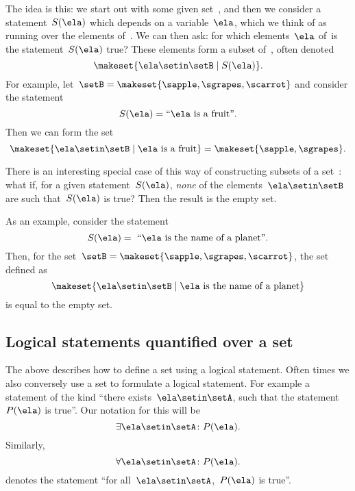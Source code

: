 The idea is this: we start out with some given set~\setB, and then we consider a statement~$S(\ela)$ which depends on a variable~$\ela$, which we think of as running over the elements of~\setB.
We can then ask: for which elements~$\ela$ of~\setB is the statement~$S(\ela)$ true?
These elements form a subset of~\setB, often denoted
%
\begin{equation}
    \label{eq:axiom-specialization}
    \makeset{ \ela \setin\setB \mid S(\ela) }.
\end{equation}
%
For example, let~$\setB = \makeset{ \sapple, \sgrapes, \scarrot}$ and consider the statement
%
\begin{equation}
    S(\ela) = \text{``$\ela$ is a fruit''}.
\end{equation}
%
Then we can form the set
%
\begin{equation}
    \makeset{ \ela \setin\setB \mid \ela \text{ is a fruit} } = \makeset{ \sapple, \sgrapes }.
\end{equation}

There is an interesting special case of this way of constructing subsets of a set~\setB:
what if, for a given statement~$S(\ela)$, \emph{none} of the elements~$\ela \setin\setB$ are such that~$S(\ela)$ is true?
Then the result is the empty set.

As an example, consider the statement
%
\begin{equation}
    S(\ela) =\text{ ``} \ela \text{ is the name of a planet''}.
\end{equation}
%
Then, for the set~$\setB = \makeset{ \sapple, \sgrapes, \scarrot }$, the set defined as
%
\begin{equation}
    \makeset{ \ela \setin\setB \mid \ela \text{ is the name of a planet} }
\end{equation}
is equal to the empty set.

\subsection{Logical statements quantified over a set}

The above describes how to define a set using a logical statement.
Often times we also conversely use a set to formulate a logical statement.
For example a statement of the kind ``there exists~$\ela \setin \setA$, such that the statement~$P(\ela)$ is true''.
Our notation for this will be
%
\begin{equation}
    \label{eq:exists-over-set}
    \exists \ela \setin \setA \colon P(\ela).
\end{equation}
%
Similarly,
\begin{equation}
    \label{eq:forall-over-set}
    \forall \ela \setin \setA \colon P(\ela).
\end{equation}
denotes the statement ``for all~$\ela \setin \setA$,~$P(\ela)$ is true''.

